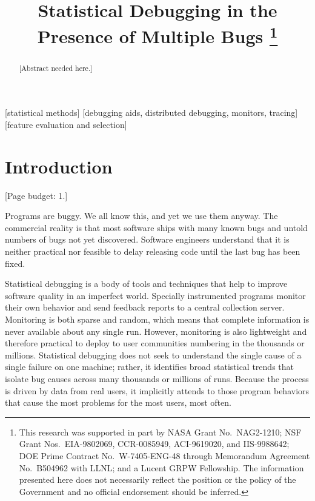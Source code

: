 \documentclass{sig-alternate}
\title{Statistical Debugging in the Presence of Multiple Bugs
  \thanks{This research was supported in part by NASA Grant No.\
    NAG2-1210; NSF Grant Nos.\ EIA-9802069, CCR-0085949, ACI-9619020,
    and IIS-9988642; DOE Prime Contract No.\ W-7405-ENG-48 through
    Memorandum Agreement No.\ B504962 with LLNL; and a Lucent GRPW
    Fellowship.  The information presented here does not necessarily
    reflect the position or the policy of the Government and no
    official endorsement should be inferred.}}
\author{
  \alignauthor Ben Liblit \eecs \\
  \alignauthor Mayur Naik \stan \\
  \alignauthor Alice X.\ Zheng \eecs \\
  \moreauthors
  \global\multiply\auwidth by 3
  \global\divide\auwidth by 2
  \alignauthor Alex Aiken \stan \\
  \alignauthor Michael I.\ Jordan \both
  \moreauthors
  \alignauthor
  \affaddr{\eecs Department of Electrical \\ Engineering and Computer Science} \\
  \affaddr{\stat Department of Statistics} \\
  \affaddr{University of California, Berkeley} \\
  \affaddr{Berkeley, CA 94720-1776}
  \alignauthor
  \affaddr{\stan Computer Science Department} \\
  \affaddr{353 Serra Mall} \\
  \affaddr{Stanford University} \\
  \affaddr{Stanford CA 94305-9025}
}
\newcommand{\placeholder}[1]{{\color[cmyk]{0,0.61,0.87,0}[#1]}}
\begin{document}
\CopyrightYear{2004}
\maketitle

\begin{abstract}
\placeholder{Abstract needed here.}
\end{abstract}

[statistical methods]
[debugging aids, distributed debugging, monitors, tracing]
[feature
  evaluation and selection]




\section{Introduction}
\label{sec:introduction}

\placeholder{Page budget: 1.}

Programs are buggy.  We all know this, and yet we use them anyway.
The commercial reality is that most software ships with many known
bugs and untold numbers of bugs not yet discovered.  Software
engineers understand that it is neither practical nor feasible to
delay releasing code until the last bug has been fixed.

Statistical debugging is a body of tools and techniques that help to
improve software quality in an imperfect world.  Specially
instrumented programs monitor their own behavior and send feedback
reports to a central collection server.  Monitoring is both sparse and
random, which means that complete information is never available about
any single run.  However, monitoring is also lightweight and therefore
practical to deploy to user communities numbering in the thousands or
millions.  Statistical debugging does not seek to understand the
single cause of a single failure on one machine; rather, it identifies
broad statistical trends that isolate bug causes across many thousands
or millions of runs.  Because the process is driven by data from real
users, it implicitly attends to those program behaviors that cause the
most problems for the most users, most often.
\end{document}
